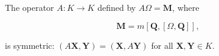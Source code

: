 The operator $A: K \to K$ defined by $A\Omega = \mathbf{M}$, where

$$\mathbf{M} = m[\mathbf{Q}, [\Omega, \mathbf{Q}]],$$

is symmetric: $(A\mathbf{X}, \mathbf{Y}) = (\mathbf{X}, A\mathbf{Y})$ for all $\mathbf{X}, \mathbf{Y} \in K$.
